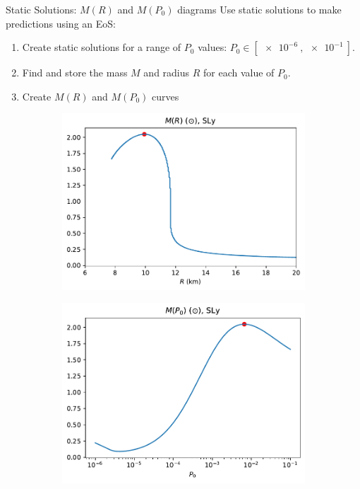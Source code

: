 \documentclass[]{beamer}
\begin{document}
    \begin{frame}{Static Solutions: $M(R)$ and $M(P_0)$ diagrams}
        \pause
        Use static solutions to make predictions using an EoS: \pause
        \begin{enumerate}
            \item Create static solutions for a range of $P_0$ values: \pause $P_0 \in [\SI{e-6}{}, \SI{e-1}{}].$\pause
            \item Find and store the mass $M$ and radius $R$ for each value of $P_0$.\pause
            \item Create $M(R)$ and $M(P_0)$ curves\pause
        \end{enumerate}

        \begin{figure}[h!]
            \centering
            \begin{subfigure}{.5\textwidth}
                \includegraphics[width = \textwidth]{../paper/images/tov/r_analysis,SLy.pdf}
            \end{subfigure}%
            \begin{subfigure}{.5\textwidth}
                \includegraphics[width = \textwidth]{../paper/images/tov/p0_analysis,SLy.pdf}

\end{subfigure}
\end{figure}
\end{frame}
\end{document}
